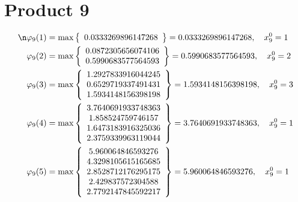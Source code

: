 \documentclass{article}
\begin{document}
\section{Product 9}
\begin{align*}
\n  
  
\varphi_{9}(1) &= \max \left\{ \begin{array}{c}
0.0333269896147268
\end{array} \right\} = 0.0333269896147268, \quad x_{9}^0 = 1\\
  
  
  
  
\varphi_{9}(2) &= \max \left\{ \begin{array}{c}
0.0872305656074106 \\
 0.5990683577564593
\end{array} \right\} = 0.5990683577564593, \quad x_{9}^0 = 2\\
  
  
  
  
\varphi_{9}(3) &= \max \left\{ \begin{array}{c}
1.2927833916044245 \\
 0.6529719337491431 \\
 1.5934148156398198
\end{array} \right\} = 1.5934148156398198, \quad x_{9}^0 = 3\\
  
  
  
  
\varphi_{9}(4) &= \max \left\{ \begin{array}{c}
3.7640691933748363 \\
 1.858524759746157 \\
 1.6473183916325036 \\
 2.3759339963119044
\end{array} \right\} = 3.7640691933748363, \quad x_{9}^0 = 1\\
  
  
  
  
\varphi_{9}(5) &= \max \left\{ \begin{array}{c}
5.960064846593276 \\
 4.3298105615165685 \\
 2.8528712176295175 \\
 2.429837572304588 \\
 2.7792147845592217
\end{array} \right\} = 5.960064846593276, \quad x_{9}^0 = 1\\
  
  
  

\end{align*}
\end{document}
